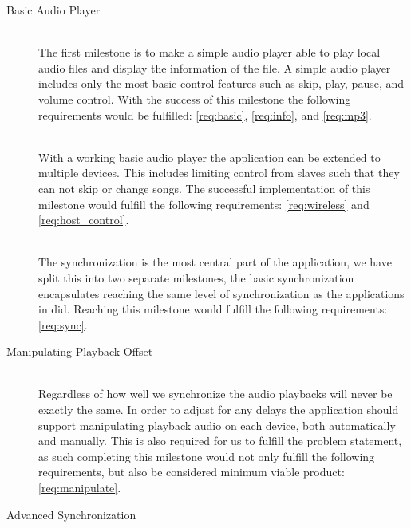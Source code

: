 \begin{description}
    \item [Basic Audio Player] \hfill \\
        The first milestone is to make a simple audio player able to play local audio files and display the information of the file.
        A simple audio player includes only the most basic control features such as skip, play, pause, and volume control.
        With the success of this milestone the following requirements would be fulfilled: \ref{req:basic}, \ref{req:info}, and \ref{req:mp3}.
    \item [] \hfill \\
        With a working basic audio player the application can be extended to multiple devices.
        This includes limiting control from slaves such that they can not skip or change songs.
        The successful implementation of this milestone would fulfill the following requirements: \ref{req:wireless} and \ref{req:host_control}.
    \item [] \hfill \\
        The synchronization is the most central part of the application, we have split this into two separate milestones, the basic synchronization encapsulates reaching the same level of synchronization as the applications in  did.
        Reaching this milestone would fulfill the following requirements: \ref{req:sync}.
    \item [Manipulating Playback Offset] \hfill \\ %
        Regardless of how well we synchronize the audio playbacks will never be exactly the same.
        In order to adjust for any delays the application should support manipulating playback audio on each device, both automatically and manually.
        This is also required for us to fulfill the problem statement, as such completing this milestone would not only fulfill the following requirements, but also be considered minimum viable product: \ref{req:manipulate}.
    \item [Advanced Synchronization] \hfill \\

\end{description}
